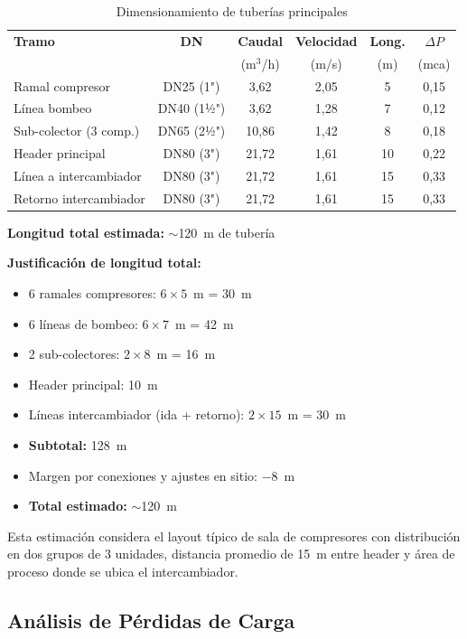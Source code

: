 \documentclass[12pt,a4paper]{article}
\begin{document}
\begin{table}[h]
\centering
\caption{Dimensionamiento de tuberías principales}
\label{tab:dim_tuberias}
\small
\begin{tabular}{lccccc}
\toprule
\textbf{Tramo} & \textbf{DN} & \textbf{Caudal} & \textbf{Velocidad} & \textbf{Long.} & \textbf{$\Delta P$} \\
 & & (m$^3$/h) & (m/s) & (m) & (mca) \\
\midrule
Ramal compresor & DN25 (1") & 3,62 & 2,05 & 5 & 0,15 \\
Línea bombeo & DN40 (1½") & 3,62 & 1,28 & 7 & 0,12 \\
Sub-colector (3 comp.) & DN65 (2½") & 10,86 & 1,42 & 8 & 0,18 \\
Header principal & DN80 (3") & 21,72 & 1,61 & 10 & 0,22 \\
Línea a intercambiador & DN80 (3") & 21,72 & 1,61 & 15 & 0,33 \\
Retorno intercambiador & DN80 (3") & 21,72 & 1,61 & 15 & 0,33 \\
\bottomrule
\end{tabular}
\end{table}

\textbf{Longitud total estimada:} $\sim$120~m de tubería

\textbf{Justificación de longitud total:}
\begin{itemize}
    \item 6 ramales compresores: $6 \times 5$~m = 30~m
    \item 6 líneas de bombeo: $6 \times 7$~m = 42~m
    \item 2 sub-colectores: $2 \times 8$~m = 16~m
    \item Header principal: 10~m
    \item Líneas intercambiador (ida + retorno): $2 \times 15$~m = 30~m
    \item \textbf{Subtotal:} 128~m
    \item Margen por conexiones y ajustes en sitio: $-8$~m
    \item \textbf{Total estimado:} $\sim$120~m
\end{itemize}

Esta estimación considera el layout típico de sala de compresores con distribución en dos grupos de 3 unidades, distancia promedio de 15~m entre header y área de proceso donde se ubica el intercambiador.

\subsection{Análisis de Pérdidas de Carga}
\end{document}
